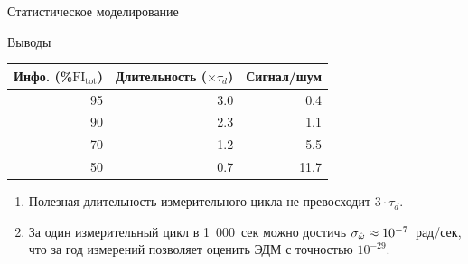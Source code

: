\documentclass[14pt]{beamer}
\begin{document}
\begin{frame}{Статистическое моделирование}
	\begin{block}{Выводы}
		\centering
		\begin{tabular}{rrr}
			\hline
			Инфо. (\%$\mathrm{FI_{tot}}$) & Длительность ($\times\tau_d$) & Сигнал/шум  \\
			\hline
			95            & 3.0                     & 0.4         \\
			90            & 2.3                     & 1.1         \\
			70            & 1.2                     & 5.5         \\
			50            & 0.7                     & 11.7        \\
			\hline
		\end{tabular}
	\begin{enumerate}
		\item Полезная длительность измерительного цикла не превосходит $3\cdot\tau_d$.
		\item За один измерительный цикл в 1~000~сек можно достичь $\sigma_{\hat{\omega}}\approx 10^{-7}$~рад/сек, что за год измерений позволяет оценить ЭДМ с точностью $10^{-29}$\ecm.
	\end{enumerate}
	\end{block} 
\end{frame}
\end{document}
